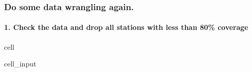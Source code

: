 \documentclass[letterpaper,10pt,english]{jupyterBook}
\begin{document}
\subsubsection{Do some data wrangling again.}
\label{\detokenize{notebooks/regional_and_local/SL_anomaly_annual:do-some-data-wrangling-again}}

\paragraph{1. Check the data and drop all stations with less than 80\% coverage}
\label{\detokenize{notebooks/regional_and_local/SL_anomaly_annual:check-the-data-and-drop-all-stations-with-less-than-80-coverage}}
\begin{sphinxuseclass}{cell}\begin{sphinxVerbatimInput}

\begin{sphinxuseclass}{cell_input}
\begin{sphinxVerbatim}[commandchars=\\\{\}]
  

  

\end{sphinxVerbatim}

\end{sphinxuseclass}\end{sphinxVerbatimInput}
\begin{sphinxVerbatimOutput}


\end{sphinxVerbatimOutput}
\end{sphinxuseclass}
\end{document}
